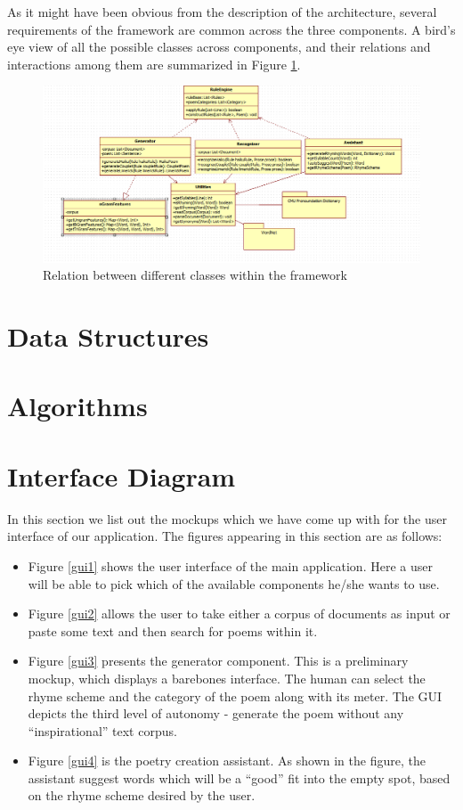 \documentclass[10pt, letter,twocolumn]{IEEEtran}
\begin{document}
As it might have been obvious from the description of the architecture, several requirements of the framework are common across the three components. A bird's eye view of all the possible classes across components, and their relations and interactions among them are summarized in Figure \ref{class1}.

\begin{figure}[ht]
  \centering
    \includegraphics[scale=0.5]{Images/class1}
    \caption{Relation between different classes within the framework}
  \label{class1}
\end{figure}

\section{Data Structures}
\section{Algorithms}
\section{Interface Diagram}
In this section we list out the mockups which we have come up with for the user interface of our application. The figures appearing in this section are as follows:
\begin{itemize}
\item Figure \ref{gui1} shows the user interface of the main application. Here a user will be able to pick which of the available components he/she wants to use.
\item Figure \ref{gui2} allows the user to take either a corpus of documents as input or paste some text and then search for poems within it.
\item Figure \ref{gui3} presents the generator component. This is a preliminary mockup, which displays a barebones interface. The human can select the rhyme scheme and the category of the poem along with its meter. The GUI depicts the third level of autonomy - generate the poem without any ``inspirational'' text corpus.
\item Figure \ref{gui4} is the poetry creation assistant. As shown in the figure, the assistant suggest words which will be a ``good'' fit into the empty spot, based on the rhyme scheme desired by the user.
\end{itemize}
\end{document}
